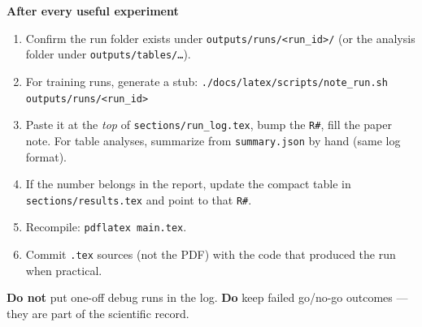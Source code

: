 \noindent\textbf{After every useful experiment}
\begin{enumerate}
  \item Confirm the run folder exists under \texttt{outputs/runs/<run\_id>/}
        (or the analysis folder under \texttt{outputs/tables/\ldots}).
  \item For training runs, generate a stub:
        \texttt{./docs/latex/scripts/note\_run.sh outputs/runs/<run\_id>}
  \item Paste it at the \emph{top} of \texttt{sections/run\_log.tex}, bump the
        \texttt{R\#}, fill the paper note. For table analyses, summarize from
        \texttt{summary.json} by hand (same log format).
  \item If the number belongs in the report, update the compact table in
        \texttt{sections/results.tex} and point to that \texttt{R\#}.
  \item Recompile: \texttt{pdflatex main.tex}.
  \item Commit \texttt{.tex} sources (not the PDF) with the code that produced
        the run when practical.
\end{enumerate}

\noindent\textbf{Do not} put one-off debug runs in the log. \textbf{Do} keep
failed go/no-go outcomes --- they are part of the scientific record.
